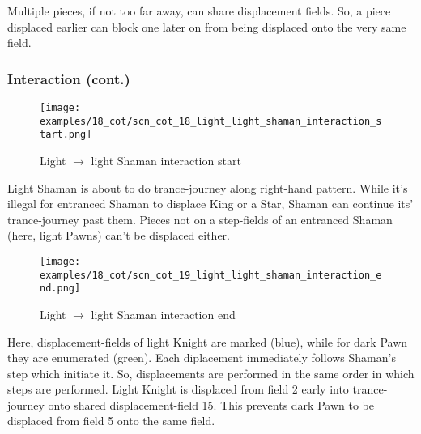 Multiple pieces, if not too far away, can share displacement fields. So, a piece
displaced earlier can block one later on from being displaced onto the very same
field.

\clearpage %

\subsubsection*{Interaction (cont.)}

\noindent
\begin{figure}[!h]
\texttt{[image: examples/18\_cot/scn\_cot\_18\_light\_light\_shaman\_interaction\_start.png]}
\caption{Light $\rightarrow$ light Shaman interaction start}
\label{fig:scn_cot_18_light_light_shaman_interaction_start}
\end{figure}

Light Shaman is about to do trance-journey along right-hand pattern. While it's illegal
for entranced Shaman to displace King or a Star, Shaman can continue its' trance-journey
past them. Pieces not on a step-fields of an entranced Shaman (here, light Pawns) can't
be displaced either.

\clearpage %

\noindent
\begin{figure}[!h]
\texttt{[image: examples/18\_cot/scn\_cot\_19\_light\_light\_shaman\_interaction\_end.png]}
\caption{Light $\rightarrow$ light Shaman interaction end}
\label{fig:scn_cot_19_light_light_shaman_interaction_end}
\end{figure}

Here, displacement-fields of light Knight are marked (blue), while for dark Pawn they
are enumerated (green). Each diplacement immediately follows Shaman's step which initiate
it. So, displacements are performed in the same order in which steps are performed. Light
Knight is displaced from field 2 early into trance-journey onto shared displacement-field
15. This prevents dark Pawn to be displaced from field 5 onto the same field.

\clearpage %

